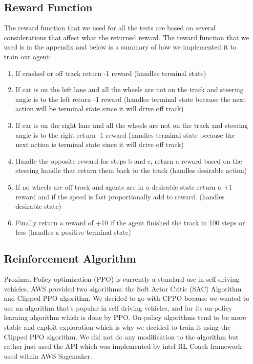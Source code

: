 \documentclass[journal]{IEEEtran}
\begin{document}
\subsection{Reward Function}
The reward function that we used for all the tests are based on several considerations that affect what the returned reward.  The reward function that we used is in the appendix and below is a summary of how we implemented it to train our agent:

\begin{enumerate}
  \item If crashed or off track return -1 reward (handles terminal state)
  \item If car is on the left lane and all the wheels are not on the track and steering angle is to the left return -1 reward (handles terminal state because the next action will be terminal state since it will drive off track)
  \item If car is on the right lane and all the wheels are not on the track and steering angle is to the right return -1 reward (handles terminal state because the next action is terminal state since it will drive off track)
  \item Handle the opposite reward for steps b and c, return a reward based on the steering handle that return them back to the track (handles desirable action)
  \item If no wheels are off track and agents are in a desirable state return a +1 reward and if the speed is fast proportionally add to reward. (handles desirable state)
  \item Finally return  a reward of +10 if the agent finished the track in 100 steps or less (handles a positive terminal state)
\end{enumerate}

\subsection{Reinforcement Algorithm}
Proximal Policy optimization (PPO) is currently a standard use in self driving vehicles.  AWS provided two algorithms: the Soft Actor Critic (SAC) Algorithm and Clipped PPO algorithm.  We decided to go with CPPO because we wanted to use an algorithm that's popular in self driving vehicles, and for its on-policy learning algorithm which is done by PPO.  On-policy algorithms tend to be more stable and exploit exploration which is why we decided to train it using the Clipped PPO algorithm.  We did not do any modification to the algorithm but rather just used the API which was implemented by intel RL Coach framework used within AWS Sagemaker.
\end{document}
